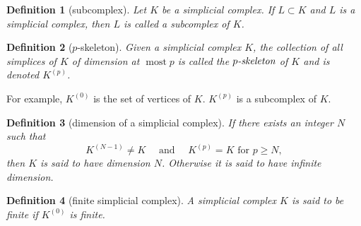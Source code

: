 \documentclass{report}
\newtheorem{definition}{Definition}[section]
\theoremstyle{nonumberplain}
\begin{document}
\begin{definition}[subcomplex]
Let $K$ be a simplicial complex. If $L\subset K$ and $L$ is a simplicial complex, then $L$ is called a \emph{subcomplex} of $K$.
\end{definition}

\begin{definition}[$p$-skeleton]
Given a simplicial complex $K$, the collection of all simplices of $K$ of dimension at $\operatorname{most} p$ is called the $\emph{$p$-skeleton}$ of $K$ and is denoted $K^{(p)}$.
\end{definition}
For example, $K^{(0)}$ is the set of vertices of $K$. $K^{(p)}$ is a subcomplex of $K$.

\begin{definition}[dimension of a simplicial complex]
If there exists an integer $N$ such that
$$
K^{(N-1)} \neq K \quad \text { and } \quad K^{(p)}=K \text { for }p\ge N ,
$$
then $K$ is said to have \emph{dimension} $N$. Otherwise it is said to have infinite dimension.
\end{definition}
\begin{definition}[finite simplicial complex]
A simplicial complex $K$ is said to be \emph{finite} if $K^{(0)}$ is finite.
\end{definition}
\end{document}
